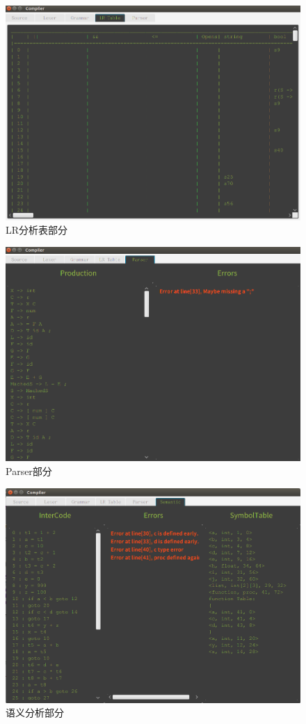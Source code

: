 \documentclass{ML}
\begin{document}
\begin{figure}[H]
    \centering
    \includegraphics[width=1\linewidth]{media/compiler-lrTable.png}
    \caption{LR分析表部分}
\end{figure}
\begin{figure}[H]
    \centering
    \includegraphics[width=1\linewidth]{media/compiler-parser.png}
    \caption{Parser部分}
\end{figure}
\begin{figure}[H]
    \centering
    \includegraphics[width=1\linewidth]{media/semantic_compiler.png}
    \caption{语义分析部分}
\end{figure}
\end{document}
